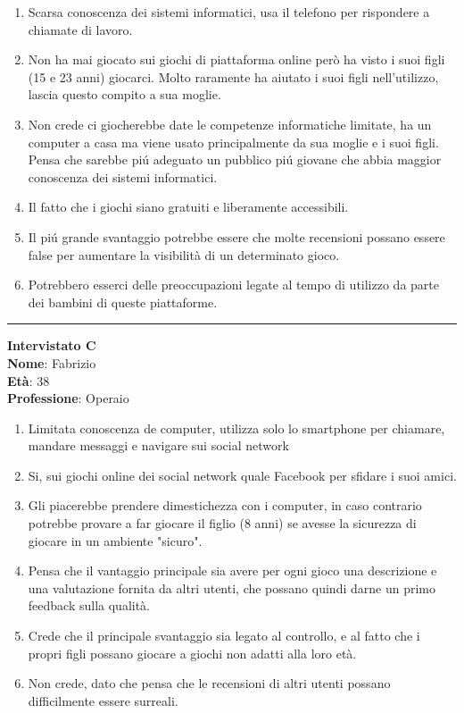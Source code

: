 \documentclass[../Report.tex]{subfiles}
\begin{document}
    \begin{enumerate}
        \item Scarsa conoscenza dei sistemi informatici, usa il telefono per rispondere a chiamate di lavoro.
        \item Non ha mai giocato sui giochi di piattaforma online però ha visto i suoi figli (15 e 23 anni) giocarci. Molto raramente ha aiutato i suoi figli nell'utilizzo, lascia questo compito a sua moglie. 
        \item Non crede ci giocherebbe date le competenze informatiche limitate, ha un computer a casa ma viene usato principalmente da sua moglie e i suoi figli. \\Pensa che sarebbe piú adeguato un pubblico piú giovane che abbia maggior conoscenza dei sistemi informatici.
        \item Il fatto che i giochi siano gratuiti e liberamente accessibili. 
        \item Il piú grande svantaggio potrebbe essere che molte recensioni possano essere false per aumentare la visibilità di un determinato gioco.
        \item Potrebbero esserci delle preoccupazioni legate al tempo di utilizzo da parte dei bambini di queste piattaforme.  
        
    \end{enumerate}
    \hrule
    \vspace{0.5cm}
    \textbf{Intervistato C}\\
    \textbf{Nome}: Fabrizio\\
    \textbf{Età}: 38\\
    \textbf{Professione}: Operaio

    \begin{enumerate}
        \item Limitata conoscenza de computer, utilizza solo lo smartphone per chiamare, mandare messaggi e navigare sui social network
        \item Si, sui giochi online dei social network quale Facebook per sfidare i suoi amici. 
        \item Gli piacerebbe prendere dimestichezza con i computer, in caso contrario potrebbe provare a far giocare il figlio (8 anni) se avesse la sicurezza di giocare in un ambiente "sicuro".
        \item Pensa che il vantaggio principale sia avere per ogni gioco una descrizione e una valutazione fornita da altri utenti, che possano quindi darne un primo feedback sulla qualità. 
        \item Crede che il principale svantaggio sia legato al controllo, e al fatto che i propri figli possano giocare a giochi non adatti alla loro età.
        \item Non crede, dato che pensa che le recensioni di altri utenti possano difficilmente essere surreali.
    \end{enumerate}
\end{document}
